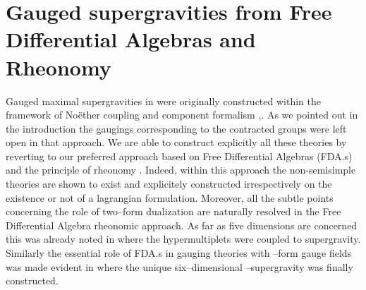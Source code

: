 \documentclass[a4paper,12pt]{article}
\begin{document}
\section{Gauged supergravities from
Free Differential Algebras  and Rheonomy} Gauged maximal
supergravities in \coordHE{} were originally constructed within the
framework of  No\"ether coupling and component formalism
\cite{gunwar},\cite{PPV}. As we pointed out in the introduction
the gaugings corresponding to the contracted groups
\coordHE{} were left open in that approach. We are able
to construct explicitly all these theories by reverting to our
preferred approach based on Free Differential Algebras (FDA.s) and
the principle of rheonomy \cite{castdauriafre}. Indeed, within
this approach the non-semisimple theories are shown to exist and
explicitely constructed irrespectively on the existence or not of
a lagrangian formulation. Moreover, all the subtle points
concerning the role of two--form dualization are naturally
resolved in the Free Differential Algebra rheonomic approach. As
far as five dimensions are concerned this was already noted  in
\cite{Ceresole:2000jd} where the hypermultiplets were coupled to
\coordHE{} supergravity. Similarly the essential role of
FDA.s in gauging theories with \coordHE{}--form gauge fields was made
evident in \cite{F4} where the unique six--dimensional
\coordHE{}--supergravity was finally constructed.
\end{document}
